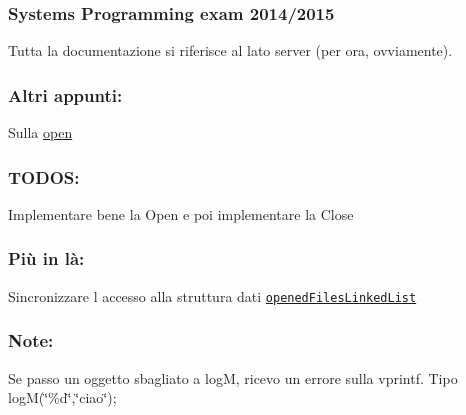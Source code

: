 \subsubsection*{Systems Programming exam 2014/2015}

Tutta la documentazione si riferisce al lato server (per ora, ovviamente). \subsubsection*{Altri appunti\+:}


\begin{DoxyItemize}
\item Sulla \hyperlink{md_OPE}{open}
\end{DoxyItemize}

\subsubsection*{T\+O\+D\+O\+S\+:}


\begin{DoxyItemize}
\item Implementare bene la Open e poi implementare la Close
\end{DoxyItemize}

\subsubsection*{Più in là\+:}


\begin{DoxyItemize}
\item Sincronizzare l\textquotesingle{} accesso alla struttura dati \href{file:///home/federicoponzi/Progetto/html/server_8c.html#a3063a74baee4fe1870e52d0ec577afa9}{\tt opened\+Files\+Linked\+List}
\end{DoxyItemize}

\subsubsection*{Note\+:}


\begin{DoxyItemize}
\item Se passo un oggetto sbagliato a log\+M, ricevo un errore sulla vprintf. Tipo log\+M(\char`\"{}\%d\char`\"{},\char`\"{}ciao\char`\"{}); 
\end{DoxyItemize}